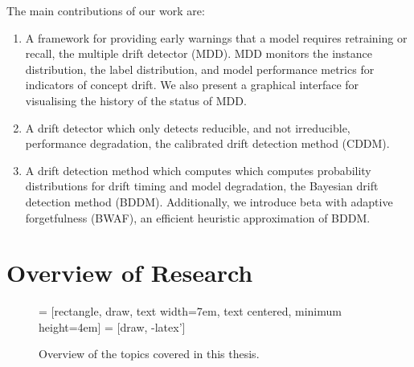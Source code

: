 The main contributions of our work are:
\begin{enumerate}
  \item A framework for providing early warnings that a model requires retraining or recall, the multiple drift detector (MDD). MDD monitors the instance distribution, the label distribution, and model performance metrics for indicators of concept drift. We also present a graphical interface for visualising the history of the status of MDD.
  \item A drift detector which only detects reducible, and not irreducible, performance degradation, the calibrated drift detection method (CDDM).
  \item A drift detection method which computes which computes probability distributions for drift timing and model degradation, the Bayesian drift detection method (BDDM). Additionally, we introduce beta with adaptive forgetfulness (BWAF), an efficient heuristic approximation of BDDM.
\end{enumerate}

\section{Overview of Research}

\begin{figure}
    \centering
     = [rectangle, draw, 
    text width=7em, text centered, minimum height=4em]
     = [draw, -latex']
    \caption{Overview of the topics covered in this thesis.}
    \label{fig:overview_topics}
\end{figure}

